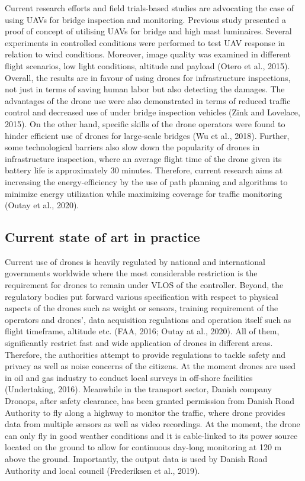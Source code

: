 \documentclass[
]{book}
\begin{document}
Current research efforts and field trials-based studies are advocating the case of using UAVs for bridge inspection and monitoring. Previous study presented a proof of concept of utilising UAVs for bridge and high mast luminaires. Several experiments in controlled conditions were performed to test UAV response in relation to wind conditions. Moreover, image quality was examined in different flight scenarios, low light conditions, altitude and payload (Otero et al., 2015). Overall, the results are in favour of using drones for infrastructure inspections, not just in terms of saving human labor but also detecting the damages. The advantages of the drone use were also demonstrated in terms of reduced traffic control and decreased use of under bridge inspection vehicles (Zink and Lovelace, 2015). On the other hand, specific skills of the drone operators were found to hinder efficient use of drones for large-scale bridges (Wu et al., 2018). Further, some technological barriers also slow down the popularity of drones in infrastructure inspection, where an average flight time of the drone given its battery life is approximately 30 minutes. Therefore, current research aims at increasing the energy-efficiency by the use of path planning and algorithms to minimize energy utilization while maximizing coverage for traffic monitoring (Outay et al., 2020).

\hypertarget{current-state-of-art-in-practice-3}{%
\subsection*{Current state of art in practice}\label{current-state-of-art-in-practice-3}}

Current use of drones is heavily regulated by national and international governments worldwide where the most considerable restriction is the requirement for drones to remain under VLOS of the controller. Beyond, the regulatory bodies put forward various specification with respect to physical aspects of the drones such as weight or sensors, training requirement of the operators and drones', data acquisition regulations and operation itself such as flight timeframe, altitude etc. (FAA, 2016; Outay at al., 2020). All of them, significantly restrict fast and wide application of drones in different areas. Therefore, the authorities attempt to provide regulations to tackle safety and privacy as well as noise concerns of the citizens. At the moment drones are used in oil and gas industry to conduct local surveys in off-shore facilities (Undertaking, 2016). Meanwhile in the transport sector, Danish company Dronops, after safety clearance, has been granted permission from Danish Road Authority to fly along a highway to monitor the traffic, where drone provides data from multiple sensors as well as video recordings. At the moment, the drone can only fly in good weather conditions and it is cable-linked to its power source located on the ground to allow for continuous day-long monitoring at 120 m above the ground. Importantly, the output data is used by Danish Road Authority and local council (Frederiksen et al., 2019).
\end{document}
